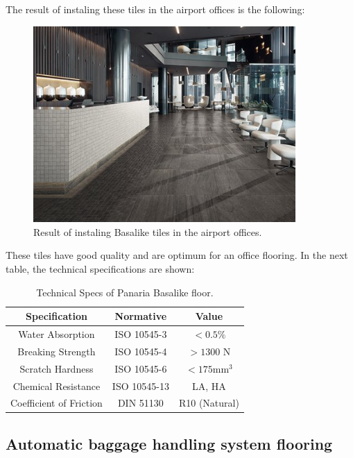 The result of instaling these tiles in the airport offices is the following:
\begin{figure}[H]
	\centering
\includegraphics[width=10cm]{./images/Resultado4}
\caption{Result of instaling Basalike tiles in the airport offices.}
\end{figure}

These tiles have good quality and are optimum for an office flooring. In the next table, the technical specifications are shown:

	\begin{table}[H]
	\centering
	\begin{tabular}{|c|c|c|}
	\hline
	Specification & Normative & Value\\
	\hline
	Water Absorption & ISO 10545-3 & $<0.5\%$\\
	\hline
	Breaking Strength & ISO 10545-4 & $>1300$ N\\
	\hline
	Scratch Hardness & ISO 10545-6 & $< 175 \mathrm{mm^3}$\\
	\hline
	Chemical Resistance & ISO 10545-13 & LA, HA\\
	\hline
	Coefficient of Friction & DIN 51130 & R10 (Natural)\\
	\hline
	\end{tabular}
	\caption{Technical Specs of Panaria Basalike floor.}
	\end{table}
	
		\subsection{Automatic baggage handling system flooring}
		
